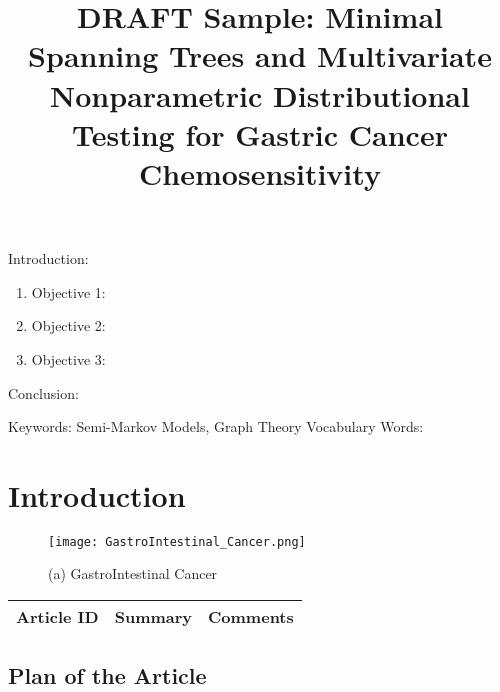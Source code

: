 
\twocolumn
\scriptsize
\begin{frontmatter}
		\title{DRAFT Sample: Minimal Spanning Trees and Multivariate Nonparametric Distributional Testing for Gastric Cancer Chemosensitivity}
		\author{}
		\address{The Mathematical Learning Space}
\end{frontmatter}	

Introduction:
\begin{enumerate}
\item Objective 1:
\item Objective 2:
\item Objective 3:
\end{enumerate}
Conclusion:

Keywords: Semi-Markov Models, Graph Theory
Vocabulary Words:

\section{Introduction}

\begin{figure}[H]
\begin{minipage}[b]{0.3\linewidth}
\texttt{[image: GastroIntestinal\_Cancer.png]} 
\end{minipage}\hfill
\caption{(a) GastroIntestinal Cancer}
\label{fig:Figure1}
\end{figure} 


\begin{table}[H]\centering
	\begin{tabular}{p{1cm}p{4cm}p{3cm}}
		Article ID & Summary & Comments\\
		\hline
		\hline
	\end{tabular}
\end{table}

\subsection{Plan of the Article}

\begin{enumerate}
\end{enumerate}


